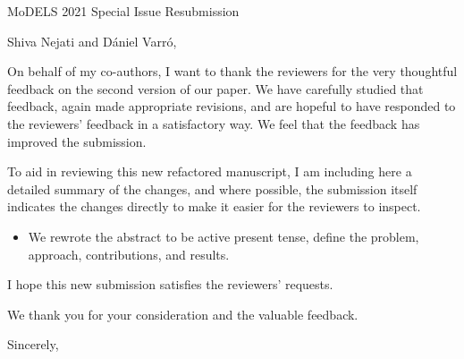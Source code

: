 \documentclass[10pt]{byu-cs}
\begin{document}
\pagestyle{headings}

\signature{Eric G Mercer\\
           Associate Professor}

\begin{letter}{MoDELS 2021 Special Issue Resubmission}

\date{\today}

\opening{Shiva Nejati and D\'{a}niel Varr\'{o},}

On behalf of my co-authors, I want to thank the reviewers for the very thoughtful feedback on the second version of our paper.
We have carefully studied that feedback, again made appropriate revisions, and are hopeful to have responded to the reviewers' feedback in a satisfactory way.
We feel that the feedback has improved the submission.

To aid in reviewing this new refactored manuscript, I am including here a detailed summary of the changes, and where possible, the submission itself indicates the changes directly to make it easier for the reviewers to inspect.
\begin{itemize}
  \item We rewrote the abstract to be active present tense, define the problem, approach, contributions, and results.
\end{itemize}

I hope this new submission satisfies the reviewers' requests.

We thank you for your consideration and the valuable feedback.

\closing{Sincerely,}

\end{letter}
\end{document}
